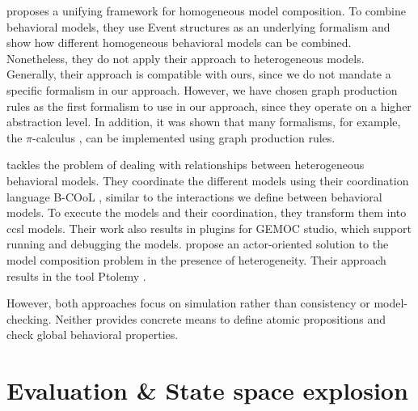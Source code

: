 \documentclass{jot}
\begin{document}
\cite{kienzleUnifyingFrameworkHomogeneous2019} proposes a unifying framework for homogeneous model composition.
To combine behavioral models, they use Event structures \cite{winskelEventStructures1987} as an underlying formalism and show how different homogeneous behavioral models can be combined.
Nonetheless, they do not apply their approach to heterogeneous models.
Generally, their approach is compatible with ours, since we do not mandate a specific formalism in our approach.
However, we have chosen graph production rules as the first formalism to use in our approach, since they operate on a higher abstraction level.
In addition, it was shown that many formalisms, for example, the $\pi$-calculus \cite{gadducciGraphRewritingPcalculus2007}, can be implemented using graph production rules.

\cite{deantoniModelingBehavioralSemantics2016} tackles the problem of dealing with relationships between heterogeneous behavioral models.
They coordinate the different models using their coordination language B-COoL \cite{varalarsenBCoolBehavioralCoordination2016}, similar to the interactions we define between behavioral models.
To execute the models and their coordination, they transform them into \gls*{ccsl} models.  
Their work also results in plugins for GEMOC studio, which support running and debugging the models.
\cite{ekerTamingHeterogeneityPtolemy2003, leeDisciplinedHeterogeneousModeling2010} propose an actor-oriented solution to the model composition problem in the presence of heterogeneity.
Their approach results in the tool Ptolemy \cite{ptolemaeusSystemDesignModeling2014}.

However, both approaches focus on simulation rather than consistency or model-checking.
Neither provides concrete means to define atomic propositions and check global behavioral properties.

\section{Evaluation \& State space explosion}
\end{document}
